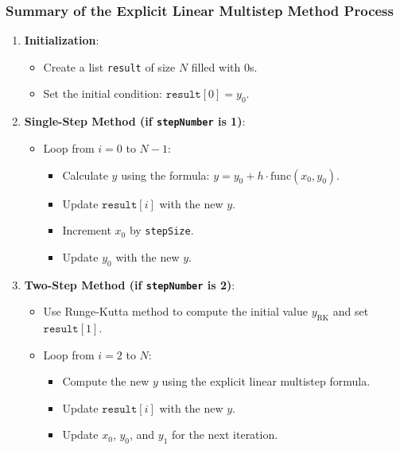 \documentclass[a4paper, twoside]{report} %
\begin{document}
	\subsubsection*{Summary of the Explicit Linear Multistep Method Process}

	\begin{enumerate}
		\item \textbf{Initialization}:
		\begin{itemize}
			\item Create a list \texttt{result} of size $N$ filled with 0s.
			\item Set the initial condition: $\texttt{result}[0] = y_0$.
		\end{itemize}

		\item \textbf{Single-Step Method (if \texttt{stepNumber} is 1)}:
		\begin{itemize}
			\item Loop from $i = 0$ to $N-1$:
			\begin{itemize}
				\item Calculate $y$ using the formula: $y = y_0 + h \cdot \text{func}(x_0, y_0)$.
				\item Update $\texttt{result}[i]$ with the new $y$.
				\item Increment $x_0$ by \texttt{stepSize}.
				\item Update $y_0$ with the new $y$.
			\end{itemize}
		\end{itemize}

		\item \textbf{Two-Step Method (if \texttt{stepNumber} is 2)}:
		\begin{itemize}
			\item Use Runge-Kutta method to compute the initial value $y_{\text{RK}}$ and set $\texttt{result}[1]$.
			\item Loop from $i = 2$ to $N$:
			\begin{itemize}
				\item Compute the new $y$ using the explicit linear multistep formula.
				\item Update $\texttt{result}[i]$ with the new $y$.
				\item Update $x_0$, $y_0$, and $y_1$ for the next iteration.
			\end{itemize}
		\end{itemize}


\end{enumerate}
\end{document}
